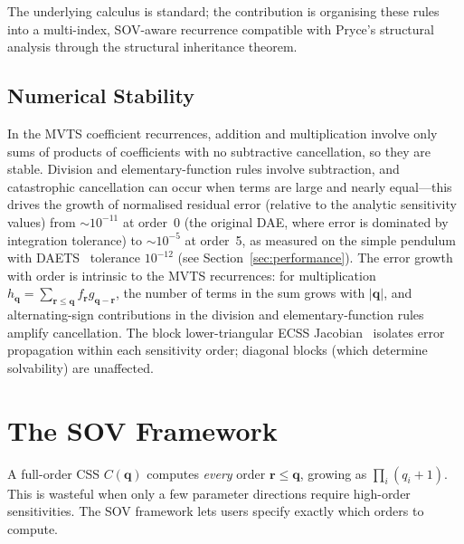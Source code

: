 \documentclass[12pt,a4paper]{article}
\theoremstyle{definition}
\theoremstyle{plain}
\theoremstyle{remark}
\newcommand{\vq}{\mathbf{q}}
\newcommand{\vr}{\mathbf{r}}
\begin{document}
The underlying calculus is standard; the contribution is organising these rules into a multi-index, SOV-aware recurrence compatible with Pryce's structural analysis through the structural inheritance theorem.

\subsection{Numerical Stability}

In the MVTS coefficient recurrences, addition and multiplication involve only sums of products of coefficients with no subtractive cancellation, so they are stable. Division and elementary-function rules involve subtraction, and catastrophic cancellation can occur when terms are large and nearly equal---this drives the growth of normalised residual error (relative to the analytic sensitivity values) from ${\sim}10^{-11}$ at order~0 (the original DAE, where error is dominated by integration tolerance) to ${\sim}10^{-5}$ at order~5, as measured on the simple pendulum with DAETS~\cite{nedialkov2008solving} tolerance $10^{-12}$ (see Section~\ref{sec:performance}). The error growth with order is intrinsic to the MVTS recurrences: for multiplication $h_{\vq} = \sum_{\vr\le\vq} f_\vr g_{\vq-\vr}$, the number of terms in the sum grows with $|\vq|$, and alternating-sign contributions in the division and elementary-function rules amplify cancellation. The block lower-triangular ECSS Jacobian~\cite{cao2026structural} isolates error propagation within each sensitivity order; diagonal blocks (which determine solvability) are unaffected.

\section{The SOV Framework}
\label{sec:sov}

A full-order CSS $C(\vq)$ computes \emph{every} order $\vr\le\vq$, growing as $\prod_i(q_i+1)$. This is wasteful when only a few parameter directions require high-order sensitivities. The SOV framework lets users specify exactly which orders to compute.
\end{document}
